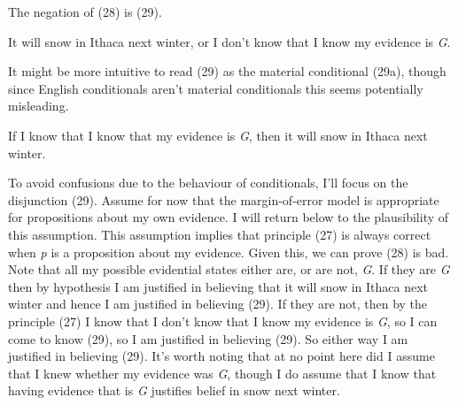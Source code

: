 \documentclass[
  11pt,
  letterpaper,
  DIV=11,
  numbers=noendperiod,
  twoside]{scrartcl}
\providecommand{\tightlist}{%
  \setlength{\itemsep}{0pt}\setlength{\parskip}{0pt}}
\begin{document}
The negation of (28) is (29).

\begin{description}
\tightlist
\item[(29)]
It will snow in Ithaca next winter, or I don't know that I know my
evidence is \emph{G}.
\end{description}

It might be more intuitive to read (29) as the material conditional
(29a), though since English conditionals aren't material conditionals
this seems potentially misleading.

\begin{description}
\tightlist
\item[(29a)]
If I know that I know that my evidence is \emph{G}, then it will snow in
Ithaca next winter.
\end{description}

To avoid confusions due to the behaviour of conditionals, I'll focus on
the disjunction (29). Assume for now that the margin-of-error model is
appropriate for propositions about my own evidence. I will return below
to the plausibility of this assumption. This assumption implies that
principle (27) is always correct when \emph{p} is a proposition about my
evidence. Given this, we can prove (28) is bad. Note that all my
possible evidential states either are, or are not, \emph{G}. If they are
\emph{G} then by hypothesis I am justified in believing that it will
snow in Ithaca next winter and hence I am justified in believing (29).
If they are not, then by the principle (27) I know that I don't know
that I know my evidence is \emph{G}, so I can come to know (29), so I am
justified in believing (29). So either way I am justified in believing
(29). It's worth noting that at no point here did I assume that I knew
whether my evidence was \emph{G}, though I do assume that I know that
having evidence that is \emph{G} justifies belief in snow next winter.
\end{document}

